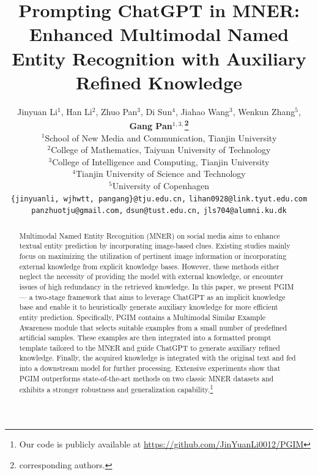 \documentclass[11pt]{article}
\title{Prompting ChatGPT in MNER: Enhanced Multimodal Named Entity Recognition with Auxiliary Refined Knowledge}
\author{Jinyuan Li$^1$, Han Li$^2$, Zhuo Pan$^3$, Di Sun$^4$, Jiahao Wang$^3$, Wenkun Zhang$^5$, \textbf{Gang Pan$^1$$^{,3,}$\thanks{\hspace{1mm} corresponding authors. }}\\
 $^1$School of New Media and Communication, Tianjin University \\
 $^2$College of Mathematics, Taiyuan University of Technology \\
 $^3$College of Intelligence and Computing, Tianjin University \\
 $^4$Tianjin University of Science and Technology\\  
 $^5$University of Copenhagen \\
  {\tt \{jinyuanli, wjhwtt, pangang\}@tju.edu.cn,} 
  {\tt lihan0928@link.tyut.edu.com} \\
  {\tt panzhuotju@gmail.com,} 
  {\tt dsun@tust.edu.cn,}
  {\tt jls704@alumni.ku.dk}
}
\begin{document}
\maketitle
\begin{abstract}
Multimodal Named Entity Recognition (MNER) on social media aims to enhance textual entity prediction by incorporating image-based clues. Existing studies mainly focus on maximizing the utilization of pertinent image information or incorporating external knowledge from explicit knowledge bases. However, these methods either neglect the necessity of providing the model with external knowledge, or encounter issues of high redundancy in the retrieved knowledge. In this paper, we present PGIM --- a two-stage framework that aims to leverage ChatGPT as an implicit knowledge base and enable it to heuristically generate auxiliary knowledge for more efficient entity prediction. Specifically, PGIM contains a Multimodal Similar Example Awareness module that selects suitable examples from a small number of predefined artificial samples. These examples are then integrated into a formatted prompt template tailored to the MNER and guide ChatGPT to generate auxiliary refined knowledge. Finally, the acquired knowledge is integrated with the original text and fed into a downstream model for further processing. Extensive experiments show that PGIM outperforms state-of-the-art methods on two classic MNER datasets and exhibits a stronger robustness and generalization capability.\footnote{Our code is publicly available at \url{https://github.com/JinYuanLi0012/PGIM}} 
\end{abstract}
\end{document}
